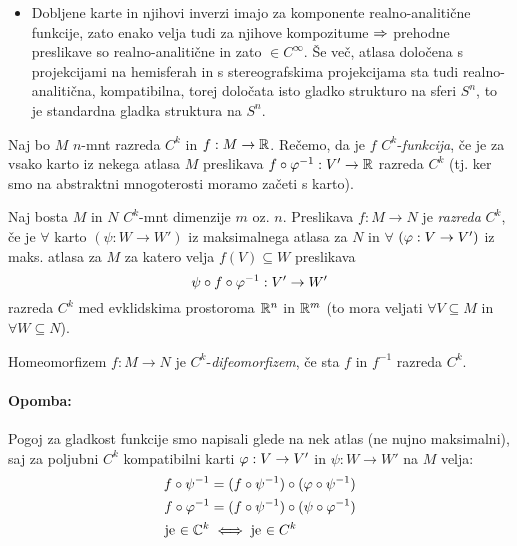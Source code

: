 \begin{zgled}
\begin{itemize}
{\begin{itemize}
{\[					\]}
			\end{itemize}}
		\item{Dobljene karte in njihovi inverzi imajo za komponente realno-analiti\v cne funkcije, zato enako velja tudi za njihove
			kompozitume $\Rightarrow$ prehodne preslikave so realno-analiti\v cne in zato $\in C^\infty$. \v Se ve\v c, atlasa dolo\v cena s
			projekcijami na hemisferah in s stereografskima projekcijama sta tudi realno-analiti\v cna, kompatibilna, torej dolo\v cata
			isto gladko strukturo na sferi $S^n$, to je standardna gladka struktura na $S^n$.}
	\end{itemize}
\end{zgled}

\begin{defin}
	Naj bo $M$ $n$-mnt razreda $C^k$ in $f : M \to \mathbb{R}$. Re\v cemo, da je $f$ $C^k$-\emph{funkcija}, \v ce je za vsako karto iz nekega
	atlasa $M$ preslikava $f \circ \varphi^{-1} : V' \to \mathbb{R}$ razreda $C^k$ (tj. ker smo na abstraktni mnogoterosti moramo za\v ceti s karto).
\end{defin}

\begin{defin}
	Naj bosta $M$ in $N$ $C^k$-mnt dimenzije $m$ oz. $n$. Preslikava $f : M \to N$ je \emph{razreda} $C^k$, \v ce je $\forall$ karto
	$(\psi : W \to W')$ iz maksimalnega atlasa za $N$ in $\forall$ $(\varphi : V \to V')$ iz maks. atlasa za $M$ za katero velja $f(V)
	\subseteq W$ preslikava
	\[
		\psi \circ f \circ \varphi^{-1} : V' \to W'
	\]
	razreda $C^k$ med evklidskima prostoroma $\mathbb{R}^n$ in $\mathbb{R}^m$ (to mora veljati $\forall V \subseteq M$ in $\forall W \subseteq N$).
\end{defin}

\begin{defin}
	Homeomorfizem $f : M \to N$ je $C^k$-\emph{difeomorfizem}, \v ce sta $f$ in $f^{-1}$ razreda $C^k$.
\end{defin}

\paragraph{Opomba:} Pogoj za gladkost funkcije smo napisali glede na nek atlas (ne nujno maksimalni), saj za poljubni $C^k$ kompatibilni karti
$\varphi : V \to V'$ in $\psi : W \to W'$ na $M$ velja: 
\begin{align*}
	f \circ \psi^{-1} &= (f \circ \psi^{-1}) \circ (\varphi \circ \psi^{-1}) \\
	f \circ \varphi^{-1} &= (f \circ \psi^{-1}) \circ (\psi \circ \varphi^{-1}) \\
	\text{je $\in \mathbb{C}^k$} &\iff \text{je $\in C^k$}
\end{align*}

